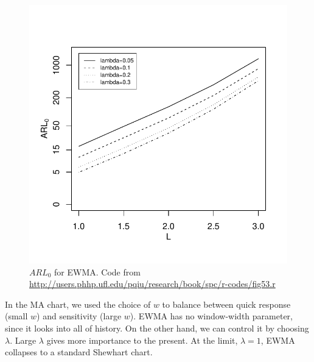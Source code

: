 \begin{figure}[h]
\centering
\includegraphics[height=0.3\textheight]{art/fig53}
\caption[$ARL_0$ for EWMA]{$ARL_0$ for EWMA. \newline Code from \url{http://users.phhp.ufl.edu/pqiu/research/book/spc/r-codes/fig53.r}}
\label{fig:arl_0_ewma}
\end{figure}

In the MA chart, we used the choice of $w$ to balance between quick response (small $w$) and sensitivity (large $w$).
EWMA has no window-width parameter, since it looks into all of history. On the other hand, we can control it by choosing $\lambda$. 
Large $\lambda$ gives more importance to the present. At the limit, $\lambda=1$, EWMA collapses to a standard Shewhart chart.








